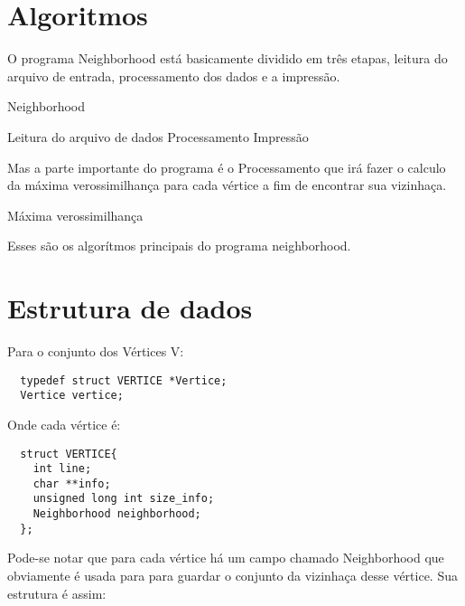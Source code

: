 \documentclass[a4paper, 12pt]{article}
\begin{document}
\section{Algoritmos}

O programa Neighborhood está basicamente dividido em três etapas, leitura do arquivo de entrada, processamento dos dados e a impressão.

\begin{algorithm}
  \caption{Neighborhood}
  \SetAlgoLined
  Leitura do arquivo de dados\;
  Processamento\;
  Impressão\;
\end{algorithm}

Mas a parte importante do programa é o Processamento que irá fazer o calculo da máxima verossimilhança para cada vértice a fim de encontrar sua vizinhaça.

\begin{algorithm}
  \caption{Máxima verossimilhança}
  \label{alg:a2}
  \SetAlgoLined
\end{algorithm}

Esses são os algorítmos principais do programa neighborhood.

\section{Estrutura de dados}
Para o conjunto dos Vértices V:
\lstset{language=C}
\begin{lstlisting}
  typedef struct VERTICE *Vertice;
  Vertice vertice;
\end{lstlisting}

Onde cada vértice é:

\begin{lstlisting}
  struct VERTICE{
    int line;
    char **info;
    unsigned long int size_info;
    Neighborhood neighborhood;
  };
\end{lstlisting}

Pode-se notar que para cada vértice há um campo chamado Neighborhood que obviamente é usada para para guardar o conjunto da vizinhaça desse vértice. Sua estrutura é assim:
\end{document}
